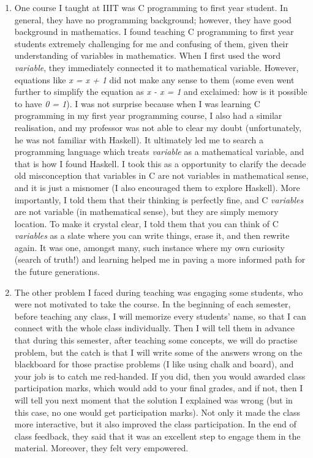 \documentclass[a4paper]{article}
\begin{document}
\begin{enumerate}
  \item One course I taught at IIIT was C programming to first year student. In general, they have no programming 
  background; however, they have good background in mathematics. I found teaching C programming to first year
  students extremely challenging for me and confusing of them, given their understanding of 
  variables in mathematics. When I first used the word
  \textit{variable}, they immediately connected it to mathematical variable. However, equations like  \textit{x = x + 1} 
  did not make any sense to them (some even went further to simplify the equation as \textit{x - x = 1} and 
  exclaimed: how is it possible to have \textit{0 = 1}). I was not surprise because when I was learning C programming
  in my first year programming course,  I also had a similar realisation, and  my professor was not able to clear my 
  doubt (unfortunately, he was not familiar with Haskell). It
 ultimately led me to search a programming language which treats \textit{variable} as a mathematical 
 variable, and that is how I found Haskell. 
 I took this as a opportunity to clarify the decade old misconception that variables in C are not variables 
 in mathematical sense, and it is just a misnomer (I also encouraged them to explore Haskell). 
 More importantly, I told them that their thinking is perfectly fine, and C \textit{variables} are not variable (in mathematical 
 sense), but they are simply memory location. To make it crystal clear, I told them that you can think of 
 C \textit{variables} as a slate where you can write things, erase it, and then rewrite again. It was one, amongst many, such instance
 where my own curiosity (search of truth!) and learning helped me in paving a more informed path for the future generations. 
  
  
  \item The other problem I faced during teaching was engaging some students, who were not motivated 
  to take the course. In the beginning of each semester, 
  before teaching any class, I will memorize every students' name, so that I can connect with the whole class individually. 
  Then I will tell them in advance that during this semester, after teaching some concepts, we will do practise problem,  but 
  the catch is that I will write some of the answers wrong on the blackboard for those practise problems (I like using 
  chalk and board), and your job is to catch me red-handed.
   If you did, then you would awarded class participation 
  marks, which would add to your final grades, and if not, then I will tell you next moment that the solution I explained was wrong 
  (but in this case, no one would get participation marks).  
  Not only it made the class more interactive, but it also improved 
  the class participation. In the end of class feedback, they said that it was an excellent step to engage them in the 
  material.  Moreover, they felt very empowered. 
   

\end{enumerate}
\end{document}
